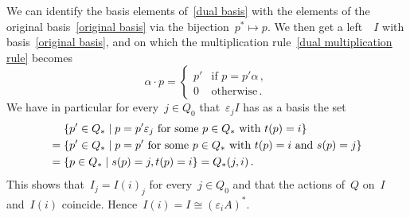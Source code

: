 \begin{remark*}
\begin{enumerate}
      We can identify the basis elements of~\eqref{dual basis} with the elements of the original basis~\eqref{original basis} via the bijection~$p^* \mapsto p$.
      We then get a left~{}~$I$ with basis~\eqref{original basis}, and on which the multiplication rule~\eqref{dual multiplication rule} becomes
      \[
        \alpha \cdot p
        =
        \begin{cases}
          p'  & \text{if~$p = p' \alpha$} \,, \\
          0   & \text{otherwise}  \,.
        \end{cases}
      \]
      We have in particular for every~$j \in Q_0$ that~$\varepsilon_j I$ has as a basis the set
      \begin{align*}
        {}&
        \{
          p' \in Q_*
        \suchthat
          \text{$p = p' \varepsilon_j$ for some~$p \in Q_*$ with~$t(p) = i$}
        \}
        \\
        ={}&
        \{
          p' \in Q_*
        \suchthat
          \text{$p = p'$ for some~$p \in Q_*$ with~$t(p) = i$ and~$s(p) = j$}
        \}
        \\
        ={}&
        \{
          p \in Q_*
        \suchthat
          s(p) = j,
          t(p) = i
        \}
        =
        Q_*(j,i)  \,.
      \end{align*}
      This shows that~$I_j = I(i)_j$ for every~$j \in Q_0$ and that the actions of~$Q$ on~$I$ and~$I(i)$ coincide.
      Hence~$I(i) = I \cong (\varepsilon_i A)^*$.
  \end{enumerate}
\end{remark*}




